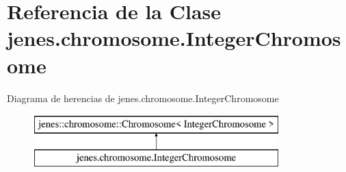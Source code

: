 \hypertarget{classjenes_1_1chromosome_1_1_integer_chromosome}{\section{Referencia de la Clase jenes.\-chromosome.\-Integer\-Chromosome}
\label{classjenes_1_1chromosome_1_1_integer_chromosome}
}
Diagrama de herencias de jenes.\-chromosome.\-Integer\-Chromosome\begin{figure}[H]
\begin{center}
\leavevmode
\includegraphics[height=2.000000cm]{classjenes_1_1chromosome_1_1_integer_chromosome}
\end{center}
\end{figure}
